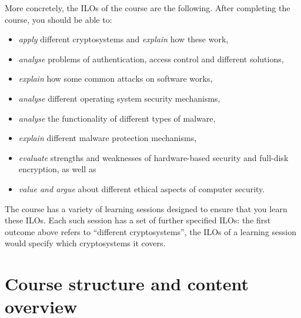 More concretely, the \acp{ILO} of the course are the following.
After completing the course, you should be able to:
\begin{frame}
\begin{itemize}

  \item \emph{apply} different cryptosystems and \emph{explain} how these work,

  \item \emph{analyse} problems of authentication, access control and different 
    solutions,

  \item \emph{explain} how some common attacks on software works,

  \item \emph{analyse} different operating system security mechanisms,

  \item \emph{analyse} the functionality of different types of malware,

  \item \emph{explain} different malware protection mechanisms,

  \item \emph{evaluate} strengths and weaknesses of hardware-based security and 
    full-disk encryption, as well as

  \item \emph{value and argue} about different ethical aspects of computer 
    security.

\end{itemize}
\end{frame}
The course has a variety of learning sessions designed to ensure that you learn 
these \acp{ILO}.
Each such session has a set of further specified \acp{ILO}:
\eg the first outcome above refers to \enquote{different cryptosystems}, the 
\acp{ILO} of a learning session would specify which cryptosystems it covers.


\section{Course structure and content overview}%
\label{sec:outline}


